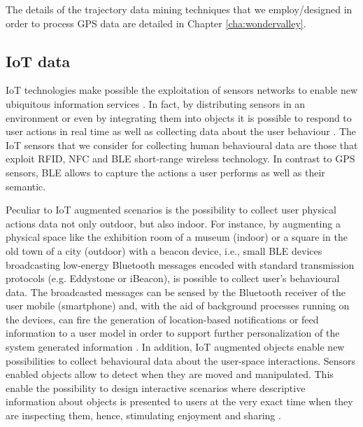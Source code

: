 The details of the trajectory data mining techniques that we employ/designed in order to process GPS data are detailed in Chapter \ref{cha:wondervalley}.

\subsection{IoT data}
IoT technologies make possible the exploitation of sensors networks to enable new ubiquitous information services \cite{iotdef:li,li:zhao:2015}. In fact, by distributing sensors in an environment or even by integrating them into objects it is possible to respond to user actions in real time as well as collecting data about the user behaviour \cite{iot:notifications, iot-sensor-healthcare, petrelli2013integrating}.
The IoT sensors that we consider for collecting human behavioural data are those that exploit  RFID, NFC and BLE short-range wireless technology. 
In contrast to GPS sensors, BLE allows to capture the actions a user performs as well as their semantic. 

Peculiar to IoT augmented scenarios is the possibility to collect user physical actions data not only outdoor, but also indoor. For instance, by augmenting a physical space like the exhibition room of a museum (indoor) or a square in the old town of a city (outdoor) with a beacon device, i.e., small BLE devices broadcasting low-energy Bluetooth messages encoded with standard transmission protocols (e.g. Eddystone or iBeacon), is possible to collect user's behavioural data.
The broadcasted messages can be sensed by the Bluetooth receiver of the user mobile (smartphone) and, with the aid of background processes running on the devices, can fire the generation of location-based notifications or feed information to a user model in order to support further personalization of the system generated information
\cite{iot:beaconinteracton:Ng:2017}.
In addition, IoT augmented objects enable new possibilities to collect behavioural data about the user-space interactions. Sensors enabled objects allow to detect when they are moved and manipulated. This enable the possibility to design interactive scenarios where descriptive information about objects is presented to users at the very exact time when they are inspecting them, hence, stimulating enjoyment and sharing \cite{iot:tangibleinteraction:2009}.


